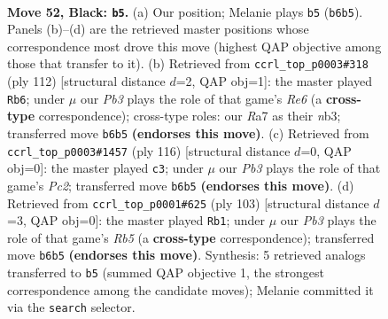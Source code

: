 \documentclass[11pt]{article}
\begin{document}
\clearpage

\begin{figure}[p]\centering
\begin{subfigure}{0.46\textwidth}\centering
\resizebox{\linewidth}{!}{%
\newchessgame
\chessboard[
  setfen={8/r7/1p5k/8/6K1/8/8/8 b - - 3 52},
  showmover=false,
  pgfstyle=straightmove, color=movearrow, markmove={b6-b5}
]}
\caption{}
\end{subfigure}\hfill
\begin{subfigure}{0.46\textwidth}\centering
\resizebox{\linewidth}{!}{%
\newchessgame
\chessboard[
  setfen={8/8/4R3/6k1/8/1n4K1/8/8 w - - 1 57},
  showmover=false,
  pgfstyle=straightmove, color=movearrow, markmove={e6-b6}
]}
\caption{}
\end{subfigure}
\\[4pt]
\begin{subfigure}{0.46\textwidth}\centering
\resizebox{\linewidth}{!}{%
\newchessgame
\chessboard[
  setfen={8/8/1k6/5R2/8/8/2P3K1/8 w - - 1 59},
  showmover=false,
  pgfstyle=straightmove, color=movearrow, markmove={c2-c3}
]}
\caption{}
\end{subfigure}\hfill
\begin{subfigure}{0.46\textwidth}\centering
\resizebox{\linewidth}{!}{%
\newchessgame
\chessboard[
  setfen={8/3k4/8/8/1r6/7R/4K3/8 b - - 5 52},
  showmover=false,
  pgfstyle=straightmove, color=movearrow, markmove={b4-b1}
]}
\caption{}
\end{subfigure}
\caption{\textbf{Move 52, Black: \texttt{b5}.} (a) Our position; Melanie plays \texttt{b5} (\texttt{b6b5}). Panels (b)--(d) are the retrieved master positions whose correspondence most drove this move (highest QAP objective among those that transfer to it). (b) Retrieved from \texttt{ccrl\_top\_p0003\#318} (ply 112) [structural distance $d$=2, QAP obj=1]: the master played \texttt{Rb6}; under $\mu$ our \emph{Pb3} plays the role of that game's \emph{Re6} (a \textbf{cross-type} correspondence); cross-type roles: our \emph{R}a7 as their \emph{n}b3; transferred move \texttt{b6b5} \textbf{(endorses this move)}. (c) Retrieved from \texttt{ccrl\_top\_p0003\#1457} (ply 116) [structural distance $d$=0, QAP obj=0]: the master played \texttt{c3}; under $\mu$ our \emph{Pb3} plays the role of that game's \emph{Pc2}; transferred move \texttt{b6b5} \textbf{(endorses this move)}. (d) Retrieved from \texttt{ccrl\_top\_p0001\#625} (ply 103) [structural distance $d$=3, QAP obj=0]: the master played \texttt{Rb1}; under $\mu$ our \emph{Pb3} plays the role of that game's \emph{Rb5} (a \textbf{cross-type} correspondence); transferred move \texttt{b6b5} \textbf{(endorses this move)}. Synthesis: 5 retrieved analogs transferred to \texttt{b5} (summed QAP objective 1, the strongest correspondence among the candidate moves); Melanie committed it via the \texttt{search} selector.}
\label{fig:thought-m103}
\end{figure}
\end{document}
